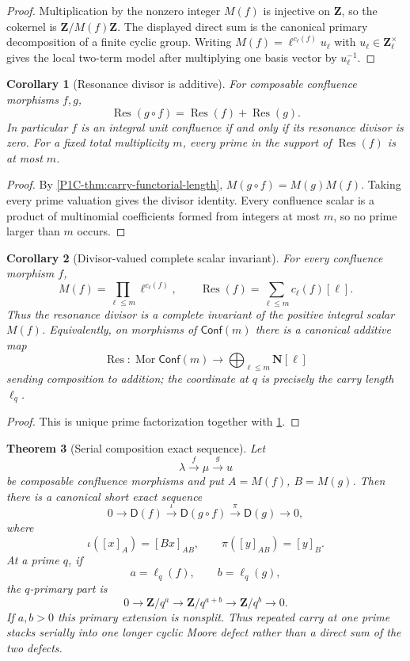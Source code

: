 \documentclass[11pt]{article}
\newtheorem{theorem}{Theorem}[section]
\newtheorem{corollary}[theorem]{Corollary}
\theoremstyle{remark}
\newcommand{\Z}{\mathbf Z}
\newcommand{\N}{\mathbf N}
\begin{document}
\begin{proof}
Multiplication by the nonzero integer $M(f)$ is injective on $\Z$, so the cokernel is
$\Z/M(f)\Z$. The displayed direct sum is the canonical primary decomposition of a finite
cyclic group. Writing $M(f)=\ell^{c_\ell(f)}u_\ell$ with
$u_\ell\in\Z_\ell^\times$ gives the local two-term model after multiplying one basis vector by
$u_\ell^{-1}$.
\end{proof}

\begin{corollary}[Resonance divisor is additive]\label{P1C-cor:resonance-divisor-additive}
For composable confluence morphisms $f,g$,
\[
 \boxed{
 \operatorname{Res}(g\circ f)
 =\operatorname{Res}(f)+\operatorname{Res}(g).}
\]
In particular $f$ is an integral unit confluence if and only if its resonance divisor is zero.
For a fixed total multiplicity $m$, every prime in the support of $\operatorname{Res}(f)$ is at most
$m$.
\end{corollary}

\begin{proof}
By \cref{P1C-thm:carry-functorial-length}, $M(g\circ f)=M(g)M(f)$. Taking every prime
valuation gives the divisor identity. Every confluence scalar is a product of multinomial
coefficients formed from integers at most $m$, so no prime larger than $m$ occurs.
\end{proof}


\begin{corollary}[Divisor-valued complete scalar invariant]
\label{P1C-cor:resonance-divisor-complete}
For every confluence morphism $f$,
\[
 \boxed{
 M(f)=\prod_{\ell\le m}\ell^{c_\ell(f)},
 \qquad
 \operatorname{Res}(f)=\sum_{\ell\le m}c_\ell(f)[\ell].}
\]
Thus the resonance divisor is a complete invariant of the positive integral scalar $M(f)$.
Equivalently, on morphisms of $\mathsf{Conf}(m)$ there is a canonical additive map
\[
 \operatorname{Res}:\operatorname{Mor}\mathsf{Conf}(m)
 \longrightarrow
 \bigoplus_{\ell\le m}\N[\ell]
\]
sending composition to addition; the coordinate at $q$ is precisely the carry length $\ell_q$.
\end{corollary}

\begin{proof}
This is unique prime factorization together with
\cref{P1C-cor:resonance-divisor-additive}.
\end{proof}

\begin{theorem}[Serial composition exact sequence]\label{P1C-thm:serial-defect-extension}
Let
\[
 \lambda\xrightarrow{f}\mu\xrightarrow{g}
u
\]
be composable confluence morphisms and put $A=M(f)$, $B=M(g)$. Then there is a canonical
short exact sequence
\[
 \boxed{
 0\longrightarrow \mathsf D(f)
 \xrightarrow{\ \iota\ }
 \mathsf D(g\circ f)
 \xrightarrow{\ \pi\ }
 \mathsf D(g)
 \longrightarrow0,}
\]
where
\[
 \iota([x]_A)=[Bx]_{AB},
 \qquad
 \pi([y]_{AB})=[y]_B.
\]
At a prime $q$, if
\[
 a=\ell_q(f),\qquad b=\ell_q(g),
\]
the $q$-primary part is
\[
 \boxed{
 0\to\Z/q^a\to\Z/q^{a+b}\to\Z/q^b\to0.}
\]
If $a,b>0$ this primary extension is nonsplit. Thus repeated carry at one prime stacks
\emph{serially} into one longer cyclic Moore defect rather than a direct sum of the two defects.
\end{theorem}
\end{document}
